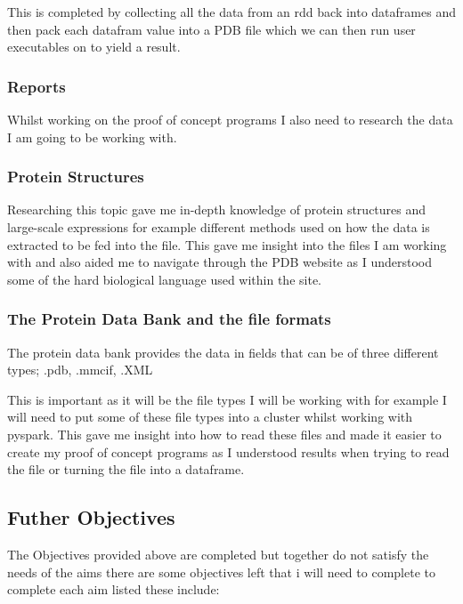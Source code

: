 \documentclass{report}
\begin{document}
This is completed by collecting all the data from an rdd back into dataframes and then pack each datafram value into a PDB file which we can then run user executables on to yield a result.


\subsubsection{Reports}

Whilst working on the proof of concept programs I also need to research the data I am going to be working with.

\subsubsection{Protein Structures}

Researching this topic gave me in-depth knowledge of protein structures and large-scale expressions for example different methods used on how the data is extracted to be fed into the file. This gave me insight into the files I am working with and also aided me to navigate through the PDB website as I understood some of the hard biological language used within the site.

\subsubsection{The Protein Data Bank and the file formats}

The protein data bank provides the data in fields that can be of three different types; .pdb, .mmcif, .XML


This is important as it will be the file types I will be working with for example I will need to put some of these file types into a cluster whilst working with pyspark. This gave me insight into how to read these files and made it easier to create my proof of concept programs as I understood results when trying to read the file or turning the file into a dataframe.

\subsection{Futher Objectives}

The Objectives provided above are completed but together do not satisfy the needs of the aims there are some objectives left that i will need to complete to complete each aim listed these include:
\end{document}
